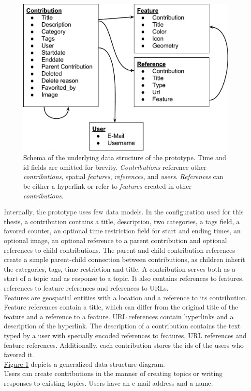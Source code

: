 \begin{figure}[!h]
    \centering
    \includegraphics[width=1\columnwidth]{images/data_structure}
    \caption{Schema of the underlying data structure of the prototype. Time and id fields are omitted for brevity. \textit{Contributions} reference other \textit{contributions}, spatial \textit{features}, \textit{references}, and \textit{users}. \textit{References} can be either a hyperlink or refer to \textit{features} created in other \textit{contributions}.}
    \label{fig:data_structure}
\end{figure}

Internally, the prototype uses few data models. In the configuration used for this thesis, a contribution contains a title, description, two categories, a tags field, a favored counter, an optional time restriction field for start and ending times, an optional image, an optional reference to a parent contribution and optional references to child contributions. The parent and child contribution references create a simple parent-child connection between contributions, as children inherit the categories, tags, time restriction and title. A contribution serves both as a start of a topic and as response to a topic. It also contains references to features, references to feature references and references to URLs.\\
Features are geospatial entities with a location and a reference to its contribution. \\
Feature references contain a title, which can differ from the original title of the feature and a reference to a feature. URL references contain hyperlinks and a description of the hyperlink. The description of a contribution contains the text typed by a user with specially encoded references to features, URL references and feature references. Additionally, each contribution stores the ids of the users who favored it.\\
\hyperref[fig:data_structure]{Figure \ref{fig:data_structure}} depicts a generalized data structure diagram.\\
Users can create contributions in the manner of creating topics or writing responses to existing topics. Users have an e-mail address and a name. 


